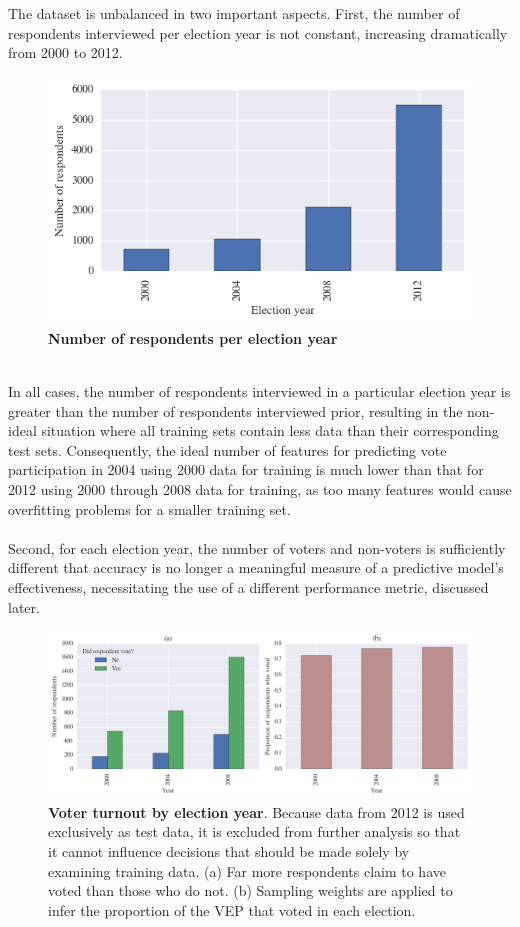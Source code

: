\documentclass{article}
\begin{document}
	The dataset is unbalanced in two important aspects. First, the number of respondents interviewed per election year is not constant, increasing dramatically from 2000 to 2012.	
	\begin{figure}[h!]
		\begin{center}
			\includegraphics*[width=0.6\linewidth]{num_respondents_by_year}
			\caption{\textbf{Number of respondents per election year}}
			\label{fig:num_respondents_by_year}
		\end{center}
	\end{figure}
	\hfill\\
	In all cases, the number of respondents interviewed in a particular election year is greater than the number of respondents interviewed prior, resulting in the non-ideal situation where all training sets contain less data than their corresponding test sets. Consequently, the ideal number of features for predicting vote participation in 2004 using 2000 data for training is much lower than that for 2012 using 2000 through 2008 data for training, as too many features would cause overfitting problems for a smaller training set.
	\\\\
	Second, for each election year, the number of voters and non-voters is sufficiently different that accuracy is no longer a meaningful measure of a predictive model's effectiveness, necessitating the use of a different performance metric, discussed later.
	\begin{figure}[h!]
		\begin{center}
			\includegraphics*[width=1\linewidth]{nonvoters_by_year}
			\caption{\textbf{Voter turnout by election year}. Because data from 2012 is used exclusively as test data, it is excluded from further analysis so that it cannot influence decisions that should be made solely by examining training data. (a) Far more respondents claim to have voted than those who do not. (b) Sampling weights are applied to infer the proportion of the VEP that voted in each election.}
			\label{fig:nonvoters_by_year}
		\end{center}
	\end{figure}
\end{document}
